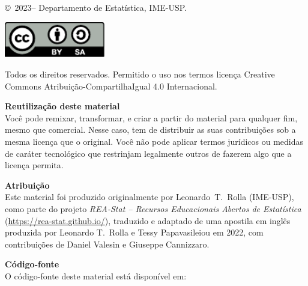 


\noindent
\copyright\
2023--{\the\year}
Departamento de Estatística, IME-USP.
\\

\vspace{1em}

\hfil
\href{https://creativecommons.org/licenses/by-sa/4.0/deed.pt-br}{\includegraphics[height=4.2em]{by-sa.pdf}}

\vspace{1em}

\noindent
Todos os direitos reservados.
Permitido o uso nos termos licença Creative Commons Atribuição-CompartilhaIgual 4.0 Internacional.

\vspace{1em}

\textbf{Reutilização deste material}
\\
\noindent
Você pode remixar, transformar, e criar a partir do material para qualquer fim, mesmo que comercial.
Nesse caso, tem de distribuir as suas contribuições sob a mesma licença que o original.
Você não pode aplicar termos jurídicos ou medidas de caráter tecnológico que restrinjam legalmente outros de fazerem algo que a licença permita.

\vspace{1em}

\textbf{Atribuição}
\\
\noindent
Este material foi produzido originalmente por Leonardo~T.~Rolla (IME-USP), como parte do projeto \emph{REA-Stat -- Recursos Educacionais Abertos de Estatística}
(\url{https://rea-stat.github.io/}),
traduzido e adaptado de uma apostila em inglês produzida por Leonardo T.\ Rolla e Tessy Papavasileiou em 2022, com contribuições de Daniel Valesin e Giuseppe Cannizzaro.

\vspace{1em}

\textbf{Código-fonte}
\\
\noindent
O código-fonte deste material está disponível em:
\\
\mysourceurl


\vspace{1em}

